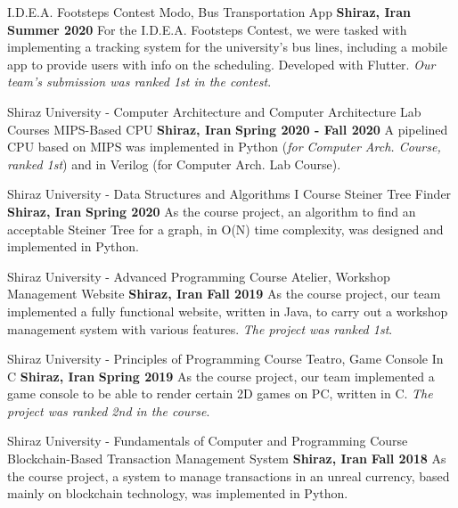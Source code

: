 \begin{cventries}
  \cventry
    {I.D.E.A. Footsteps Contest} %
    {Modo, Bus Transportation App} %
    {\textbf{Shiraz, Iran}} %
    {\textbf{Summer 2020}} %
    {
      For the I.D.E.A. Footsteps Contest, we were tasked with implementing a tracking system for the university’s bus lines, including a mobile app to provide users with info on the scheduling. Developed with Flutter. \emph{Our team’s submission was ranked 1st in the contest}.
    }

  \cventry
    {Shiraz University - Computer Architecture and Computer Architecture Lab Courses} %
    {MIPS-Based CPU} %
    {\textbf{Shiraz, Iran}} %
    {\textbf{Spring 2020 - Fall 2020}} %
    {
      A pipelined CPU based on MIPS was implemented in Python (\emph{for Computer Arch. Course, ranked 1st}) and in Verilog (for Computer Arch. Lab Course).
    }

  \cventry
    {Shiraz University - Data Structures and Algorithms I Course} %
    {Steiner Tree Finder} %
    {\textbf{Shiraz, Iran}} %
    {\textbf{Spring 2020}} %
    {
      As the course project, an algorithm to find an acceptable Steiner Tree for a graph, in O(N) time complexity, was designed and implemented in Python.
    }

  \cventry
    {Shiraz University - Advanced Programming Course} %
    {Atelier, Workshop Management Website} %
    {\textbf{Shiraz, Iran}} %
    {\textbf{Fall 2019}} %
    {
      As the course project, our team implemented a fully functional website, written in Java, to carry out a workshop management system with various features. \emph{The project was ranked 1st}.
    }

  \cventry
    {Shiraz University - Principles of Programming Course} %
    {Teatro, Game Console In C} %
    {\textbf{Shiraz, Iran}} %
    {\textbf{Spring 2019}} %
    {
      As the course project, our team implemented a game console to be able to render certain 2D games on PC, written in C. \emph{The project was ranked 2nd in the course}.
    }

  \cventry
    {Shiraz University - Fundamentals of Computer and Programming Course} %
    {Blockchain-Based Transaction Management System} %
    {\textbf{Shiraz, Iran}} %
    {\textbf{Fall 2018}} %
    {
      As the course project, a system to manage transactions in an unreal currency, based mainly on blockchain technology, was implemented in Python.
    }

\end{cventries}
